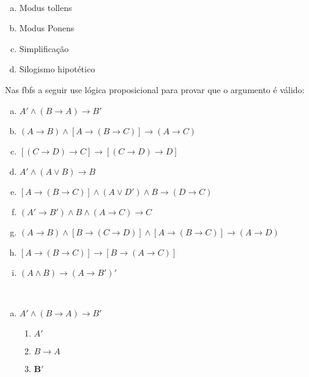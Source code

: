 \documentclass[a4paper, 12pt, addpoints]{exam}
\begin{document}
\begin{questions}
  \begin{resp}~
    
    \begin{multicols}{2}
      \begin{enumerate}[a)]
        \item Modus tollens
        \item Modus Ponens
        \item Simplificação
        \item Silogismo hipotético
      \end{enumerate}
    \end{multicols}
  \end{resp}

  \question Nas fbfs a seguir  use lógica proposicional para provar que o argumento é
  válido:

  \begin{enumerate}[a)]
    \item $A' \wedge (B \rightarrow A) \rightarrow B'$
    \item $(A \rightarrow B) \wedge [A \rightarrow (B \rightarrow C)] \rightarrow (A \rightarrow C)$
    \item $[(C \rightarrow D) \rightarrow C] \rightarrow [(C \rightarrow D) \rightarrow D]$
    \item $A' \wedge (A \vee B) \rightarrow B$
    \item $[A \rightarrow (B \rightarrow C)] \wedge (A \vee D') \wedge B \rightarrow (D \rightarrow C)$
    \item $(A' \rightarrow B') \wedge B \wedge (A \rightarrow C) \rightarrow C$
    \item $(A \rightarrow B) \wedge [B \rightarrow (C \rightarrow D)] \wedge [A \rightarrow (B \rightarrow C)] \rightarrow (A \rightarrow D)$
    \item $[A \rightarrow (B \rightarrow C)] \rightarrow [B \rightarrow (A \rightarrow C)]$
    \item $(A \wedge B) \rightarrow (A \rightarrow B')'$
  \end{enumerate}

  \begin{resp}~

    \begin{enumerate}[a)]
      \item $A' \wedge (B \rightarrow A) \rightarrow B'$ 
      \begin{multicols}{2}

        \begin{enumerate}[1.]
          \item $A'$
          \item $B \rightarrow A$
          \item $\boldsymbol{B'}$
        \end{enumerate}
        

\end{multicols}
\end{enumerate}
\end{resp}
\end{questions}
\end{document}
